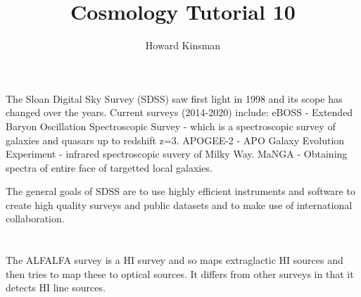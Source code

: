 \documentclass[a4paper,12pt]{article}
\author{Howard Kinsman}
\title{Cosmology Tutorial 10}
\begin{document}
\maketitle
\section{}
The Sloan Digital Sky Survey (SDSS) saw first light in 1998 and its scope has changed over the years. Current surveys (2014-2020) include:
\newline
eBOSS - Extended Baryon Oscillation Spectroscopic Survey - which is a spectroscopic survey of galaxies and quasars up to redshift z=3.
\newline
APOGEE-2 - APO Galaxy Evolution Experiment - infrared spectroscopic suvery of Milky Way.
\newline
MaNGA - Obtaining spectra of entire face of targetted local galaxies.

The general goals of SDSS are to use highly efficient instruments and software to create high quality surveys and public datasets and to make use
of international collaboration.
\section{} 
The ALFALFA survey is a HI survey and so maps extraglactic HI sources and then tries to map these to optical sources. It differs from other surveys in that
it detects HI line sources.
\end{document}

